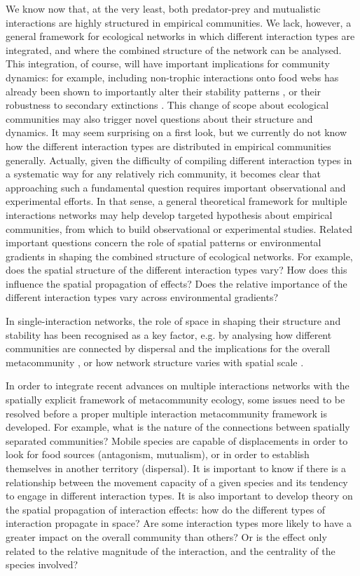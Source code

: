 We know now that, at the very least, both predator-prey and mutualistic interactions are highly structured in empirical communities. We lack, however, a general framework for ecological networks in which different interaction types are integrated, and where the combined structure of the network can be analysed. This integration, of course, will have important implications for community dynamics: for example, including non-trophic interactions onto food webs has already been shown to importantly alter their stability patterns \citep{Kefi2012, Kefi2016a}, or their robustness to secondary extinctions \citep{Pocock2012}. This change of scope about ecological communities may also trigger novel questions about their structure and dynamics. It may seem surprising on a first look, but we currently do not know how the different interaction types are distributed in empirical communities generally. Actually, given the difficulty of compiling different interaction types in a systematic way for any relatively rich community, it becomes clear that approaching such a fundamental question requires important observational and experimental efforts. In that sense, a general theoretical framework for multiple interactions networks may help develop targeted hypothesis about empirical communities, from which to build observational or experimental studies. Related important questions concern the role of spatial patterns or environmental gradients in shaping the combined structure of ecological networks. For example, does the spatial structure of the different interaction types vary? How does this influence the spatial propagation of effects? Does the relative importance of the different interaction types vary across environmental gradients?

In single-interaction networks, the role of space in shaping their structure and stability has been recognised as a key factor, e.g. by analysing how different communities are connected by dispersal and the implications for the overall metacommunity \citep{Leibold2004}, or how network structure varies with spatial scale \citep{Galiana2018}.

In order to integrate recent advances on multiple interactions networks with the spatially explicit framework of metacommunity ecology, some issues need to be resolved before a proper multiple interaction metacommunity framework is developed. For example, what is the nature of the connections between spatially separated communities? Mobile species are capable of displacements in order to look for food sources (antagonism, mutualism), or in order to establish themselves in another territory (dispersal). It is important to know if there is a relationship between the movement capacity of a given species and its tendency to engage in different interaction types. It is also important to develop theory on the spatial propagation of interaction effects: how do the different types of interaction propagate in space? Are some interaction types more likely to have a greater impact on the overall community than others? Or is the effect only related to the relative magnitude of the interaction, and the centrality of the species involved?

